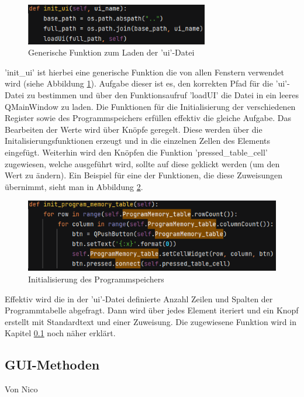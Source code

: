 \documentclass[12pt]{article}
\newcommand{\imgSpaceBefore}{\vspace{10pt}}
\begin{document}
\vspace{15pt}

\begin{figure}[H]
\centering
\includegraphics[width=8cm]{bilder/initUI}
\caption{Generische Funktion zum Laden der 'ui'-Datei}
\label{fig:InitUI}
\end{figure}


\noindent
'init\_ui' ist hierbei eine generische Funktion die von allen Fenstern verwendet wird (siehe Abbildung  \ref{fig:InitUI}).
Aufgabe dieser ist es, den korrekten Pfad für die 'ui'-Datei zu bestimmen und über den Funktionsaufruf 'loadUI' die Datei in ein leeres QMainWindow zu laden. Die Funktionen für die Initialisierung der verschiedenen Register sowie des Programmspeichers erfüllen effektiv die gleiche Aufgabe. Das Bearbeiten der Werte wird über Knöpfe geregelt. Diese werden über die Initalisierungsfunktionen erzeugt und in die einzelnen Zellen des Elements eingefügt. Weiterhin wird den Knöpfen die Funktion 'pressed\_table\_cell' zugewiesen, welche ausgeführt wird, sollte auf diese geklickt werden (um den Wert zu ändern). Ein Beispiel für eine der Funktionen, die diese Zuweisungen übernimmt, sieht man in Abbildung \ref{fig:InitProgMem}.\imgSpaceBefore

\begin{figure}[H]
\centering
\includegraphics[width=12cm]{bilder/initProgMem}
\caption{Initialisierung des Programmspeichers}
\label{fig:InitProgMem}
\end{figure}

\noindent
Effektiv wird die in der 'ui'-Datei definierte Anzahl Zeilen und Spalten der Programmtabelle abgefragt. Dann wird über jedes Element iteriert und ein Knopf erstellt mit Standardtext und einer Zuweisung. Die zugewiesene Funktion wird in Kapitel \ref{chapter:GUI-Methods} noch näher erklärt.


\subsection{GUI-Methoden}\label{chapter:GUI-Methods}
Von Nico\\
\end{document}
